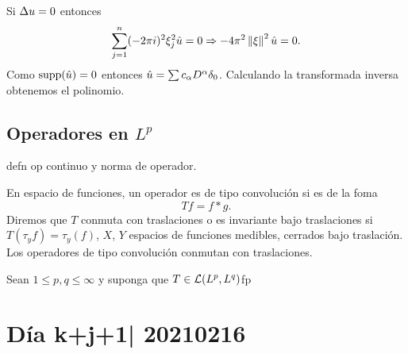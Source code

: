 \documentclass[12pt]{memoir}
\begin{document}
\begin{ptcbp}
  Si $\Delta u=0$ entonces 
  $$\sum_{j=1}^n(-2\pi i)^2\xi_j^2\hat{u}=0\Rightarrow -4\pi^2\left\|\xi\right\|^2\hat{u}=0.$$
  Como $\operatorname{supp}(\hat{u})=0$ entonces $\hat{u}=\sum c_\alpha D^\alpha \delta_0$. Calculando la transformada inversa obtenemos el polinomio.
\end{ptcbp}

\subsection{Operadores en $L^p$}

defn op continuo y norma de operador.\par 
En espacio de funciones, un operador es de tipo convolución si es de la foma $$Tf = f\ast g.$$
Diremos que $T$ conmuta con traslaciones o es invariante bajo traslaciones si $T(\tau_yf)=\tau_y(f)$, $X$, $Y$ espacios de funciones medibles, cerrados bajo traslación. Los operadores de tipo convolución conmutan con traslaciones.

\begin{Th}
  Sean $1\leq p,q\leq \infty$ y suponga que $T\in\mathcal{L}(L^p,L^q)$fp
\end{Th}

\section{Día k+j+1| 20210216}
\ifx\nextra\undefined
\printindex
\else\fi
\nocite{*}


\end{document}
